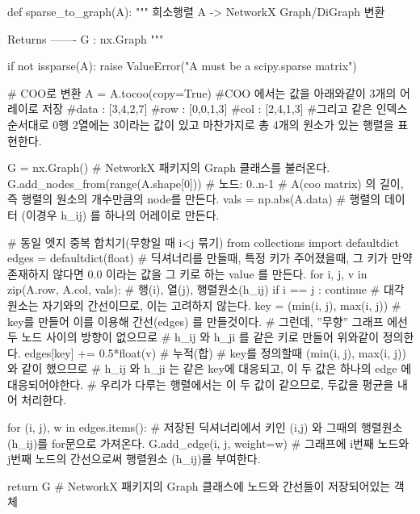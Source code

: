 \documentclass[11pt]{article}
\begin{document}
\begin{CodeBox}[title={Example: Python snippet}]
def sparse_to_graph(A):
    """
    희소행렬 A -> NetworkX Graph/DiGraph 변환

    Returns
    -------
    G : nx.Graph
    """
    
    if not issparse(A):
        raise ValueError("A must be a scipy.sparse matrix")
    
    # COO로 변환
    A = A.tocoo(copy=True)
    #COO 에서는 값을 아래와같이 3개의 어레이로 저장 
    #data : [3,4,2,7]
    #row : [0,0,1,3]
    #col : [2,4,1,3]
    #그리고 같은 인덱스 순서대로 0행 2열에는 3이라는 값이 있고 마찬가지로 총 4개의 원소가 있는 행렬을 표현한다. 

    G = nx.Graph()
    # NetworkX 패키지의 Graph 클래스를 불러온다. 
    G.add_nodes_from(range(A.shape[0]))  # 노드: 0..n-1
    # A(coo matrix) 의 길이, 즉 행렬의 원소의 개수만큼의 node를 만든다. 
    vals = np.abs(A.data)
    # 행렬의 데이터 (이경우 h_ij) 를 하나의 어레이로 만든다. 

    # 동일 엣지 중복 합치기(무향일 때 i<j 묶기)
    from collections import defaultdict
    edges = defaultdict(float)
    # 딕셔너리를 만들때, 특정 키가 주어졌을때, 그 키가 만약 존재하지 않다면 0.0 이라는 값을 그 키로 하는 value 를 만든다. 
    for i, j, v in zip(A.row, A.col, vals):
    # 행(i), 열(j), 행렬원소(h_ij)
        if i == j :
            continue
            # 대각원소는 자기와의 간선이므로, 이는 고려하지 않는다. 
        key = (min(i, j), max(i, j))
        # key를 만들어 이를 이용해 간선(edges) 를 만들것이다. 
        # 그런데, ''무향'' 그래프 에선 두 노드 사이의 방향이 없으므로
        # h_ij 와 h_ji 를 같은 키로 만들어 위와같이 정의한다. 
        edges[key] += 0.5*float(v) 
        # 누적(합)
        # key를 정의할때 (min(i, j), max(i, j))와 같이 했으므로 
        # h_ij 와 h_ji 는 같은 key에 대응되고, 이 두 값은 하나의 edge 에 대응되어야한다. 
        # 우리가 다루는 행렬에서는 이 두 값이 같으므로, 두값을 평균을 내어 처리한다. 

        for (i, j), w in edges.items():
        # 저장된 딕셔너리에서 키인 (i,j) 와 그때의 행렬원소 (h_ij)를 for문으로 가져온다.
            G.add_edge(i, j, weight=w)
            # 그래프에 i번째 노드와 j번째 노드의 간선으로써 행렬원소 (h_ij)를 부여한다. 

    return G # NetworkX 패키지의 Graph 클래스에 노드와 간선들이 저장되어있는 객체
\end{CodeBox}
\end{document}
